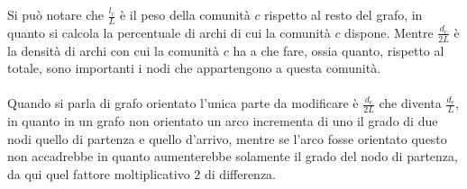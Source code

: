 %
Si può notare che $\displaystyle\frac{l_c}{L}$ è il peso della comunità $c$ rispetto al resto del grafo, in quanto si calcola la percentuale di archi di cui la comunità $c$ dispone. Mentre $\displaystyle\frac{d_c}{2L}$ è la densità di archi con cui la comunità $c$ ha a che fare, ossia quanto, rispetto al totale, sono importanti i nodi che appartengono a questa comunità.\\
\\
Quando si parla di grafo orientato l'unica parte da modificare è $\displaystyle\frac{d_c}{2L}$ che diventa $\displaystyle\frac{d_c}{L}$, in quanto in un grafo non orientato un arco incrementa di uno il grado di due nodi quello  di partenza e quello d'arrivo, mentre se l'arco fosse orientato questo non accadrebbe in quanto aumenterebbe solamente il grado del nodo di partenza, da qui quel fattore moltiplicativo $2$ di differenza.
%
%
